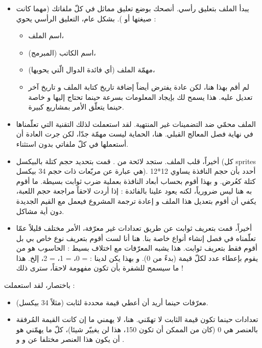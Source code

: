 \begin{itemize}
	\item يبدأ الملف بتعليق رأسي. أنصحك بوضع تعليق مماثل في كلّ ملفاتك (مهما كانت صيغتها
	أو
	).
	بشكل عام، التعليق الرأسي يحوي :
	\begin{itemize}
		\item اسم الملف،
		\item اسم الكاتب (المبرمج)،
		\item مهمّة الملف (أي فائدة الدوال الّتي يحويها)،
		\item لم أقم بهذا هنا، لكن عادة يفترض أيضاً إضافة تاريخ كتابة الملف و تاريخ آخر تعديل عليه. هذا يسمح لك بإيجاد المعلومات بسرعة حينما تحتاج إليها و خاصة حينما يتعلّق الأمر بمشاريع كبيرة.
	\end{itemize}
	\item الملف محمّي ضد التضمينات غير المنتهية. لقد استعملت لذلك التقنية التي تعلّمناها في نهاية فصل المعالج القبلي. هنا، الحماية ليست مهمّة جدّا، لكن جرت العادة أن أستعملها في كلّ ملفاتي
	بدون استثناء.
	\item أخيراً، قلب الملف. ستجد لائحة من 
	.
	قمت بتحديد حجم كتلة بالبيكسل (كل
	\textenglish{sprites}
	هي عبارة عن مربّعات ذات حجم 34 بيكسل). أحدد بأن حجم النافذة يساوي 12*12 كتلة كعُرض. و بهذا أقوم بحساب أبعاد النافذة بعملية ضرب ثوابت بسيطة. ما أقوم به هنا ليس ضرورياً، لكنه يعود علينا بالفائدة : إذا أردت لاحقاً مراجعة حجم اللعبة، يكفي أن أقوم بتعديل هذا الملف و إعادة ترجمة المشروع فيعمل مع القيم الجديدة دون أية مشاكل.
	\item أخيراً، قمت بتعريف ثوابت عن طريق تعدادات غير معرّفة، الأمر مختلف قليلاً عمّا تعلّمناه في فصل إنشاء أنواع خاصة بنا. هنا أنا لست أقوم بتعريف نوع خاص بي بل أقوم فقط بتعريف ثوابت. هذا يشبه المعرّفات مع اختلاف بسيط : الحاسوب هو من يقوم بإعطاء عدد لكلّ قيمة (بدءً من 0). و بهذا يكن لدينا : 
	 = 0،
	 = 1،
	 = 2،
	إلخ. هذا ما سيسمح للشفرة بأن تكون مفهومة لاحقاً، سترى ذلك !
\end{itemize}

باختصار، لقد استعملت :

\begin{itemize}
	\item معرّفات حينما أريد أن أعطي قيمة محددة لثابت (مثلاً 34 بيكسل).
	\item تعدادات حينما تكون قيمة الثابت لا تهمّني. هنا، لا يهمني ما إن كانت القيمة المُرفقة بالعنصر
	هي 0 (كان من الممكن أن تكون 150، هذا لن يغييّر شيئا)، كلّ ما يهمّني هو أن يكون هذا العنصر مختلفا عن
	و
	و
	.
\end{itemize}


